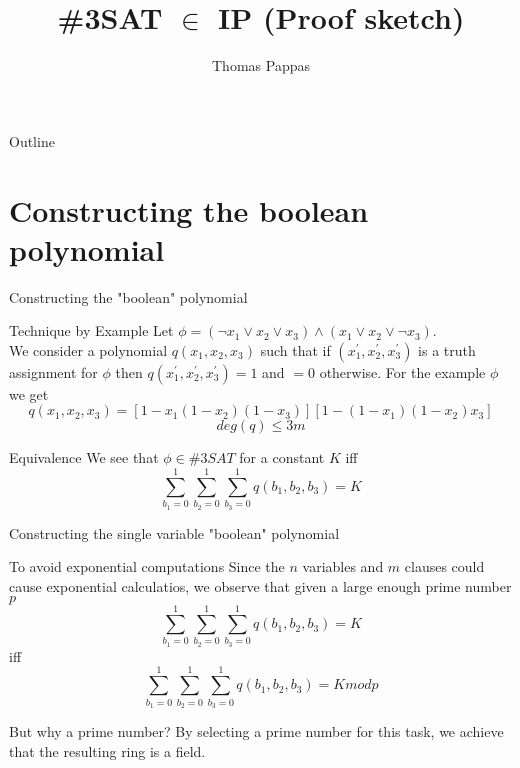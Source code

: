 \documentclass{beamer}
\begin{document}
\title{\#3SAT $\in$ IP (Proof sketch)}
\author{Thomas Pappas}
\maketitle

\begin{frame}{Outline}
  \tableofcontents
\end{frame}

\section{Constructing the boolean polynomial}

\begin{frame}{Constructing the "boolean" polynomial}
  \begin{block}{Technique by Example}
    Let $\phi = (\neg x_1 \vee x_2 \vee x_3) \wedge (x_1 \vee x_2 \vee \neg x_3).$\\
    We consider a polynomial $q(x_1,x_2,x_3)$ such that if $(x_1^\prime,x_2^\prime,x_3^\prime)$ is a truth assignment for $\phi$ then $q(x_1^\prime,x_2^\prime,x_3^\prime)=1$ and $=0$ otherwise.
    For the example $\phi$ we get
    $$q(x_1,x_2,x_3)=[1-x_1(1-x_2)(1-x_3)][1-(1-x_1)(1-x_2)x_3]$$
    $$deg(q) \leq 3m$$
  \end{block}
  \begin{block}{Equivalence}
    We see that $\phi \in \#3SAT$ for a constant $K$ iff
    $$\sum_{b_1=0}^1 \sum_{b_2=0}^1 \sum_{b_3=0}^1 q(b_1,b_2,b_3) = K$$
  \end{block}
\end{frame}

\begin{frame}{Constructing the single variable "boolean" polynomial}
  \begin{block}{To avoid exponential computations}
    Since the $n$ variables and $m$ clauses could cause exponential calculatios, we observe that given a large enough prime number $p$
    $$\sum_{b_1=0}^1 \sum_{b_2=0}^1 \sum_{b_3=0}^1 q(b_1,b_2,b_3) = K$$ iff $$\sum_{b_1=0}^1 \sum_{b_2=0}^1 \sum_{b_3=0}^1 q(b_1,b_2,b_3) = K modp$$
  \end{block}
  \begin{block}{But why a prime number?}
    By selecting a prime number for this task, we achieve that the resulting ring is a field.
  \end{block}
\end{frame}
\end{document}

